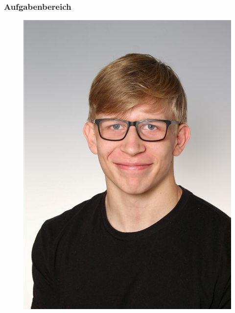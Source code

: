 \subsubsection*{Aufgabenbereich}
\begin{figure}[H]
	\includegraphics[scale=1]{images/stefan_waldl.jpg}
\end{figure}
